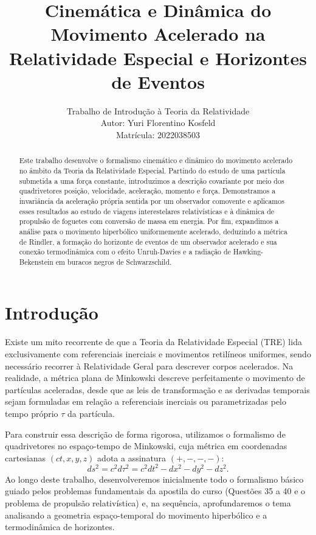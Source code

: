 \documentclass[11pt, a4paper]{article}
\title{\textbf{Cinemática e Dinâmica do Movimento Acelerado na Relatividade Especial e Horizontes de Eventos}}
\author{Trabalho de Introdução à Teoria da Relatividade \\ Autor: Yuri Florentino Kosfeld \\ Matrícula: 2022038503}
\date{}
\begin{document}
\maketitle

\begin{abstract}
Este trabalho desenvolve o formalismo cinemático e dinâmico do movimento acelerado no âmbito da Teoria da Relatividade Especial. Partindo do estudo de uma partícula submetida a uma força constante, introduzimos a descrição covariante por meio dos quadrivetores posição, velocidade, aceleração, momento e força. Demonstramos a invariância da aceleração própria sentida por um observador comovente e aplicamos esses resultados ao estudo de viagens interestelares relativísticas e à dinâmica de propulsão de foguetes com conversão de massa em energia. Por fim, expandimos a análise para o movimento hiperbólico uniformemente acelerado, deduzindo a métrica de Rindler, a formação do horizonte de eventos de um observador acelerado e sua conexão termodinâmica com o efeito Unruh-Davies e a radiação de Hawking-Bekenstein em buracos negros de Schwarzschild.
\end{abstract}

\section{Introdução}

Existe um mito recorrente de que a Teoria da Relatividade Especial (TRE) lida exclusivamente com referenciais inerciais e movimentos retilíneos uniformes, sendo necessário recorrer à Relatividade Geral para descrever corpos acelerados. Na realidade, a métrica plana de Minkowski descreve perfeitamente o movimento de partículas aceleradas, desde que as leis de transformação e as derivadas temporais sejam formuladas em relação a referenciais inerciais ou parametrizadas pelo tempo próprio $\tau$ da partícula.

Para construir essa descrição de forma rigorosa, utilizamos o formalismo de quadrivetores no espaço-tempo de Minkowski, cuja métrica em coordenadas cartesianas $(ct, x, y, z)$ adota a assinatura $(+, -, -, -)$:
\begin{equation}
ds^2 = c^2 d\tau^2 = c^2 dt^2 - dx^2 - dy^2 - dz^2.
\end{equation}
Ao longo deste trabalho, desenvolveremos inicialmente todo o formalismo básico guiado pelos problemas fundamentais da apostila do curso (Questões 35 a 40 e o problema de propulsão relativística) e, na sequência, aprofundaremos o tema analisando a geometria espaço-temporal do movimento hiperbólico e a termodinâmica de horizontes.
\end{document}
